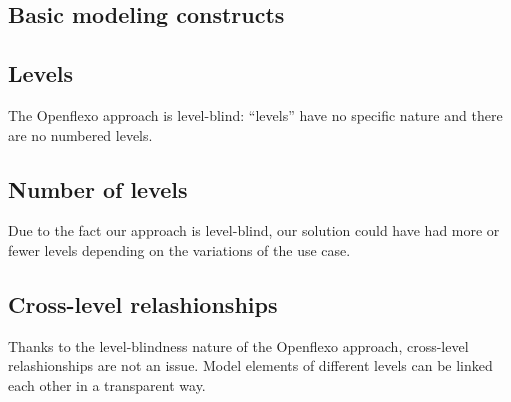 
  \subsection{Basic modeling constructs}

  \subsection{Levels}


  The Openflexo approach is level-blind: ``levels'' have no specific
  nature and there are no numbered levels. 

  \subsection{Number of levels}

  Due to the fact our approach is level-blind, our solution could have had more
  or fewer levels depending on the variations of the use case. %

  \subsection{Cross-level relashionships}


  Thanks to the level-blindness nature of the Openflexo approach, cross-level
  relashionships are not an issue. Model elements of different levels can be
  linked each other in a transparent way. %

